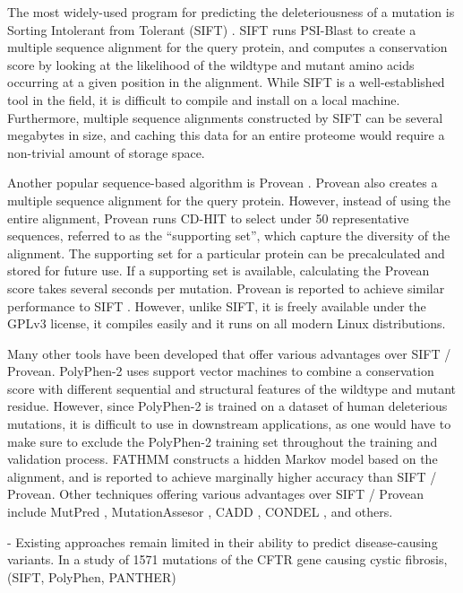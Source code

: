 
The most widely-used program for predicting the deleteriousness of a mutation is Sorting Intolerant from Tolerant (SIFT) \cite{ng_sift:_2003}. SIFT runs PSI-Blast to create a multiple sequence alignment for the query protein, and computes a conservation score by looking at the likelihood of the wildtype and mutant amino acids occurring at a given position in the alignment. While SIFT is a well-established tool in the field, it is difficult to compile and install on a local machine. Furthermore, multiple sequence alignments constructed by SIFT can be several megabytes in size, and caching this data for an entire proteome would require a non-trivial amount of storage space.

Another popular sequence-based algorithm is Provean \cite{choi_predicting_2012}. Provean also creates a multiple sequence alignment for the query protein. However, instead of using the entire alignment, Provean runs CD-HIT to select under 50 representative sequences, referred to as the ``supporting set'', which capture the diversity of the alignment. The supporting set for a particular protein can be precalculated and stored for future use. If a supporting set is available, calculating the Provean score takes several seconds per mutation. Provean is reported to achieve similar performance to SIFT \cite{choi_predicting_2012}. However, unlike SIFT, it is freely available under the GPLv3 license, it compiles easily and it runs on all modern Linux distributions.

Many other tools have been developed that offer various advantages over SIFT / Provean. PolyPhen-2 \cite{adzhubei_predicting_2001} uses support vector machines to combine a conservation score with different sequential and structural features of the wildtype and mutant residue. However, since PolyPhen-2 is trained on a dataset of human deleterious mutations, it is difficult to use in downstream applications, as one would have to make sure to exclude the PolyPhen-2 training set throughout the training and validation process. FATHMM \cite{shihab_ranking_2014} constructs a hidden Markov model based on the alignment, and is reported to achieve marginally higher accuracy than SIFT / Provean. Other techniques offering various advantages over SIFT / Provean include MutPred \cite{li_automated_2009}, MutationAssesor \cite{network_integrated_2011}, CADD \cite{kircher_general_2014}, CONDEL \cite{gonzalez-perez_improving_2011}, and others.



- Existing approaches remain limited in their ability to predict disease-causing variants. In a study of 1571 mutations of the CFTR gene causing cystic fibrosis, (SIFT, PolyPhen, PANTHER)

